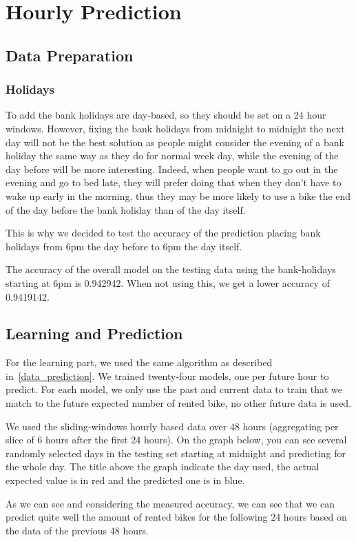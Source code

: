 
\section{Hourly Prediction}

\subsection{Data Preparation}


\subsubsection{Holidays}

To add the bank holidays are day-based, so they should be set on a 24 hour windows.
However, fixing the bank holidays from midnight to midnight the next day will not
be the best solution as people might consider the evening of a bank holiday the same
way as they do for normal week day, while the evening of the day before will be more
interesting. Indeed, when people want to go out in the evening and go to bed late,
they will prefer doing that when they don't have to wake up early in the morning,
thus they may be more likely to use a bike the end of the day before the bank
holiday than of the day itself.

This is why we decided to test the accuracy of the prediction placing bank holidays
from 6pm the day before to 6pm the day itself.

The accuracy of the overall model on the testing data using the bank-holidays
starting at 6pm is 0.942942. When not using this, we get a lower accuracy of
0.9419142.

\subsection{Learning and Prediction}

For the learning part, we used the same algorithm as described in~\ref{data_prediction}.
We trained twenty-four models, one per future hour to predict.
For each model, we only use the past and current data to train that we match to
the future expected number of rented bike, no other future data is used.

We used the sliding-windows hourly based data over 48 hours (aggregating per slice
of 6 hours after the first 24 hours).
On the graph below, you can see several randomly selected days in the testing set
starting at midnight and predicting for the whole day. The title above the graph
indicate the day used, the actual expected value is in red and the predicted one
is in blue.

As we can see and considering the measured accuracy, we can see that we can predict
quite well the amount of rented bikes for the following 24 hours based on the data of
the previous 48 hours.
